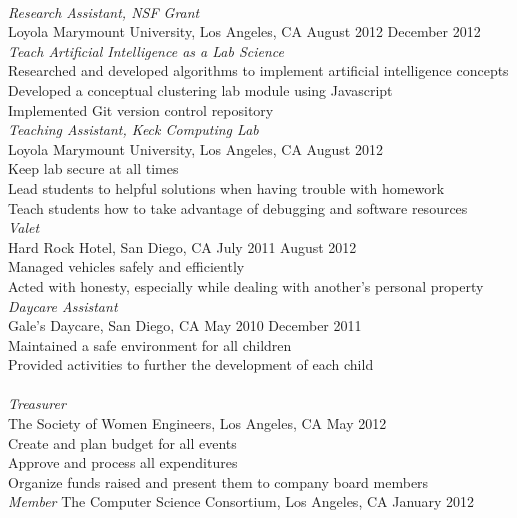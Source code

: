 \documentclass[11pt]{article}
\begin{document}
\vspace{1.5mm}\\
\indent \emph{Research Assistant, NSF Grant}\\
\indent Loyola Marymount University, Los Angeles, CA \hfill August 2012 \- December 2012\\
\indent \indent \emph{Teach Artificial Intelligence as a Lab Science}\\
\indent \indent Researched and developed algorithms to implement artificial intelligence concepts\\
\indent \indent Developed a conceptual clustering lab module using Javascript\\
\indent \indent Implemented Git version control repository\vspace{2mm}\\
\indent \emph{Teaching Assistant, Keck Computing Lab}\\
\indent Loyola Marymount University, Los Angeles, CA \hfill August 2012 \-\\
\indent \indent Keep lab secure at all times\\
\indent \indent Lead students to helpful solutions when having trouble with homework\\
\indent \indent Teach students how to take advantage of debugging and software resources\vspace{2mm}\\
\indent \emph{Valet}\\
\indent Hard Rock Hotel, San Diego, CA \hfill July 2011 \- August 2012\\
\indent \indent Managed vehicles safely and efficiently\\
\indent \indent Acted with honesty, especially while dealing with another’s personal property\vspace{2mm}\\
\indent \emph{Daycare Assistant}\\
\indent Gale’s Daycare, San Diego, CA \hfill May 2010 \- December 2011\\
\indent \indent Maintained a safe environment for all children\\
\indent \indent Provided activities to further the development of each child\\

\vspace{1.5mm}\\
\indent \emph{Treasurer}\\
\indent The Society of Women Engineers, Los Angeles, CA \hfill May 2012 \-\\
\indent \indent Create and plan budget for all events\\
\indent \indent Approve and process all expenditures\\
\indent \indent Organize funds raised and present them to company board members\vspace{2mm}\\
\indent \emph{Member}
\indent The Computer Science Consortium, Los Angeles, CA \hfill January 2012 \-\\
\end{document}
